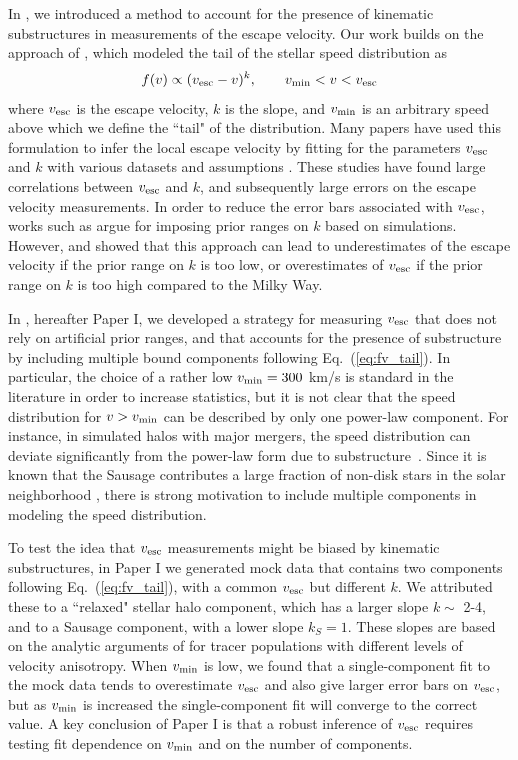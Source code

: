 \documentclass[twocolumn,preprintnumbers]{aastex63}
\newcommand {\be} {\begin {equation}}
\newcommand {\ee} {\end {equation}}
\DeclareRobustCommand{\Eq}[1]{Eq.~(\ref{#1})}
\renewcommand{\be}{\begin{equation}}
\renewcommand{\ee}{\end{equation}}
\newcommand{\vesc}{v_{\rm esc}}
\newcommand{\vmin}{v_{\rm min}}
\begin{document}
In \cite{methodology}, we introduced a method to account for the presence of kinematic substructures in measurements of the escape velocity. Our work builds on the approach of  \cite{1990ApJ}, which modeled the tail of the stellar speed distribution as 
\be \label{eq:fv_tail}
f(v) \propto (\vesc - v)^k, \quad\quad \vmin < v < \vesc
\ee
where $\vesc$ is the escape velocity,  $k$ is the slope, and $\vmin$ is an arbitrary speed above which we define the ``tail" of the distribution. Many papers have used this formulation to infer the local escape velocity by fitting for the parameters $\vesc$ and $k$ with various datasets and assumptions \citep{2007MNRAS.379..755S,2014A&A...562A..91P,2018A&A...616L...9M,2019arXiv190102016D,2020arXiv200616283K}. These studies have found large correlations between $\vesc$ and $k$, and subsequently large errors on the escape velocity measurements. In order to reduce the error bars associated with $\vesc$, works such as \cite{1990ApJ,2007MNRAS.379..755S,2014A&A...562A..91P,2018A&A...616L...9M,2019arXiv190102016D} argue for imposing prior ranges on $k$ based on simulations. However, \cite{2019MNRAS.487L..72G} and \cite{methodology} showed that this approach can lead to underestimates of the escape velocity if the prior range on $k$ is too low, or overestimates of $\vesc$ if the prior range on $k$ is too high compared to the Milky Way.

In \cite{methodology}, hereafter Paper I, we developed a strategy for measuring $\vesc$ that does not rely on artificial prior ranges, and that accounts for the presence of substructure by including multiple bound components following \Eq{eq:fv_tail}. In particular, the choice of a rather low $\vmin = 300$ km/s is standard in the literature in order to increase statistics, but it is not clear that the speed distribution for $v > \vmin$ can be described by only one power-law component. For instance, in simulated halos with major mergers, the speed distribution can deviate significantly from the power-law form due to substructure~\citep{2019MNRAS.487L..72G}. Since it is known that the Sausage contributes a large fraction of non-disk stars in the solar neighborhood \citep{2019ApJ...874....3N,2019arXiv190707681N}, there is strong motivation to include multiple components in modeling the speed distribution.

To test the idea that $\vesc$ measurements might be biased by kinematic substructures, in Paper I we generated mock data that contains two components following \Eq{eq:fv_tail}, with a common $\vesc$ but different $k$. We attributed these to a ``relaxed" stellar halo component, which has a larger slope $k \sim$ 2-4, and to a Sausage component, with a lower slope $k_{S} =1$. These slopes are based on the analytic arguments of \cite{2019arXiv190102016D} for tracer populations with different levels of velocity anisotropy. When $\vmin$ is low, we found that a single-component fit to the mock data tends to overestimate $\vesc$ and also give larger error bars on $\vesc$, but as $\vmin$ is increased the single-component fit will converge to the correct value. A key conclusion of Paper I is that a robust inference of $\vesc$ requires testing fit dependence on $\vmin$ and on the number of components.
\end{document}
